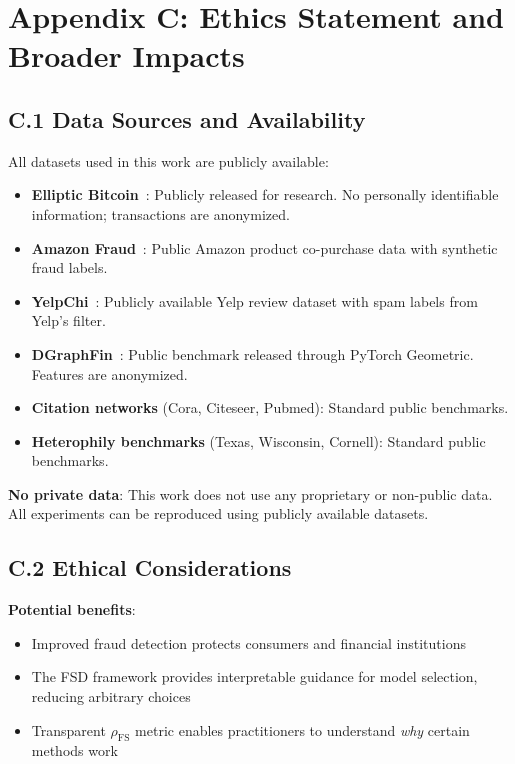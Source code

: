 \section*{Appendix C: Ethics Statement and Broader Impacts}

\subsection*{C.1 Data Sources and Availability}

All datasets used in this work are publicly available:

\begin{itemize}
\item \textbf{Elliptic Bitcoin}~\cite{weber2019anti}: Publicly released for research. No personally identifiable information; transactions are anonymized.
\item \textbf{Amazon Fraud}~\cite{mcauley2015amazon}: Public Amazon product co-purchase data with synthetic fraud labels.
\item \textbf{YelpChi}~\cite{rayana2015yelp}: Publicly available Yelp review dataset with spam labels from Yelp's filter.
\item \textbf{DGraphFin}~\cite{huang2022dgraph}: Public benchmark released through PyTorch Geometric. Features are anonymized.
\item \textbf{Citation networks} (Cora, Citeseer, Pubmed): Standard public benchmarks.
\item \textbf{Heterophily benchmarks} (Texas, Wisconsin, Cornell): Standard public benchmarks.
\end{itemize}

\textbf{No private data}: This work does not use any proprietary or non-public data. All experiments can be reproduced using publicly available datasets.

\subsection*{C.2 Ethical Considerations}

\textbf{Potential benefits}:
\begin{itemize}
\item Improved fraud detection protects consumers and financial institutions
\item The FSD framework provides interpretable guidance for model selection, reducing arbitrary choices
\item Transparent $\rho_{\text{FS}}$ metric enables practitioners to understand \textit{why} certain methods work
\end{itemize}


